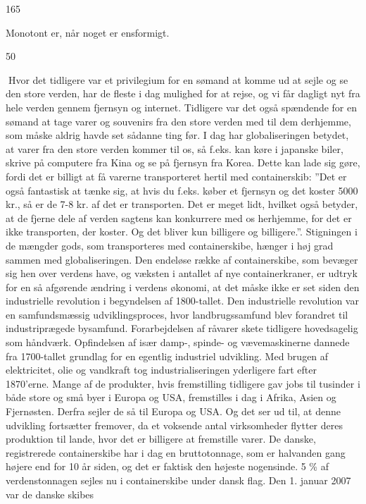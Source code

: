165

Monotont er, når noget er ensformigt.

50

Hvor det tidligere var et privilegium for en sømand at komme ud at
sejle og se den store verden, har de fleste i dag mulighed for at rejse,
og vi får dagligt nyt fra hele verden gennem fjernsyn og internet.
Tidligere var det også spændende for en sømand at tage varer og
souvenirs fra den store verden med til dem derhjemme, som måske aldrig
havde set sådanne ting før. I dag har globaliseringen betydet, at varer
fra den store verden kommer til os, så f.eks. kan køre i japanske biler,
skrive på computere fra Kina og se på fjernsyn fra Korea. Dette kan lade
sig gøre, fordi det er billigt at få varerne transporteret hertil med
containerskib: ''Det er også fantastisk at tænke sig, at hvis du f.eks.
køber et fjernsyn og det koster 5000 kr., så er de 7-8 kr. af det er
transporten. Det er meget lidt, hvilket også betyder, at de fjerne dele
af verden sagtens kan konkurrere med os herhjemme, for det er ikke
transporten, der koster. Og det bliver kun billigere og billigere.''.
Stigningen i de mængder gods, som transporteres med containerskibe,
hænger i høj grad sammen med globaliseringen. Den endeløse række af
containerskibe, som bevæger sig hen over verdens have, og væksten i
antallet af nye containerkraner, er udtryk for en så afgørende ændring i
verdens økonomi, at det måske ikke er set siden den industrielle
revolution i begyndelsen af 1800-tallet. Den industrielle revolution var
en samfundsmæssig udviklingsproces, hvor landbrugssamfund blev forandret
til industriprægede bysamfund. Forarbejdelsen af råvarer skete tidligere
hovedsagelig som håndværk. Opfindelsen af især damp-, spinde- og
vævemaskinerne dannede fra 1700-tallet grundlag for en egentlig
industriel udvikling. Med brugen af elektricitet, olie og vandkraft tog
industrialiseringen yderligere fart efter 1870'erne. Mange af de
produkter, hvis fremstilling tidligere gav jobs til tusinder i både
store og små byer i Europa og USA, fremstilles i dag i Afrika, Asien og
Fjernøsten. Derfra sejler de så til Europa og USA. Og det ser ud til, at
denne udvikling fortsætter fremover, da et voksende antal virksomheder
flytter deres produktion til lande, hvor det er billigere at fremstille
varer. De danske, registrerede containerskibe har i dag en
bruttotonnage, som er halvanden gang højere end for 10 år siden, og det
er faktisk den højeste nogensinde. 5 \% af verdenstonnagen sejles nu i
containerskibe under dansk flag. Den 1. januar 2007 var de danske skibes
